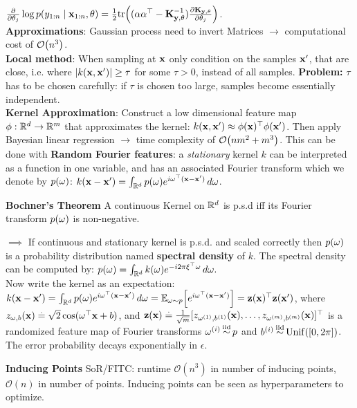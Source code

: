 $\pdv{}{\theta_j} \log p(y_{1:n} \mid \vx_{1:n}, \vtheta) = \frac{1}{2} \tr{(\valpha \transpose{\valpha} - \inv{\mK_{\vy,\vtheta}}) \pdv{\mK_{\vy,\vtheta}}{\theta_j}}$.\\
\textbf{Approximations}: Gaussian process need to invert Matrices $\rightarrow$ computational cost of $\BigO{n^3}$. \\ 
\textbf{Local method}: When sampling at $\mathbf{x}$ only condition on the samples $\mathbf{x'}$, that are close, i.e. where $\left| k(\mathbf{x}, \mathbf{x'}) \right| \geq \tau$ for some $\tau > 0$, instead of all samples. \textbf{Problem:} $\tau$ has to be chosen carefully: if $\tau$ is chosen too large, samples become essentially independent. \\
\textbf{Kernel Approximation}: Construct a low dimensional feature map $\mathbf{\phi} : \mathbb{R}^d \to \mathbb{R}^m$ that approximates the kernel: $k(\mathbf{x}, \mathbf{x'}) \approx \mathbf{\phi}(\mathbf{x})^\top \mathbf{\phi}(\mathbf{x'})$. Then apply Bayesian linear regression $\rightarrow$ time complexity of $\BigO{n m^2 + m^3}$. This can be done with \textbf{Random Fourier features}: a \textit{stationary} kernel $k$ can be interpreted as a function in one variable, and has an associated Fourier transform which we denote by $p(\mathbf{\omega})$: $k(\mathbf{x}-\mathbf{x'}) = \int_{\mathbb{R}^d} p(\mathbf{\omega}) e^{i \mathbf{\omega}^\top (\mathbf{x}-\mathbf{x'})} \,d\mathbf{\omega}$.
\begin{framed}
    \textbf{Bochner's Theorem} A continuous Kernel on $\mathbb{R}^d$ is p.s.d iff its Fourier transform $p(\mathbf{\omega})$ is non-negative.
\end{framed}
$\implies$ If continuous and stationary kernel is p.s.d. and scaled correctly then $p(\mathbf{\omega})$ is a probability distribution named \textbf{spectral density} of $k$. The spectral density can be computed by: $p(\mathbf{\omega}) = \int_{\mathbb{R}^d} k(\mathbf{\omega}) e^{- i 2 \pi \mathbf{\xi}^\top \mathbf{\omega}} \,d\mathbf{\omega}.$ \\ Now write the kernel as an expectation: $k(\vx-\vxp) = \int_{\R^d} p(\vomega) e^{i \transpose{\vomega} (\vx-\vxp)} \,d\vomega = \E[\vomega \sim p]{e^{i \transpose{\vomega}(\vx-\vxp)}}= \transpose{\vz(\vx)} \vz(\vxp)$, where $z_{\mathbf{\omega},b}(\mathbf{x}) \overset{.}{=} \sqrt{2} \cos(\mathbf{\omega}^\top \mathbf{x} + b)$, and $\mathbf{z}(\mathbf{x}) \overset{.}{=} \frac{1}{\sqrt{m}} [z_{\mathbf{\omega}^{(1)},b^{(1)}}(\mathbf{x}), \dots, z_{\mathbf{\omega}^{(m)},b^{(m)}}(\mathbf{x})]^\top$ is a randomized feature map of Fourier transforms $\mathbf{\omega}^{(i)} \operatorname*{\smash{\overset{\mathrm{iid}}{\sim}}} p$ and $b^{(i)} \iid \Unif{\brackets{0, 2 \pi}}$. The error probability decays exponentially in $\epsilon$.
\begin{framed}
    \textbf{Inducing Points}    
    SoR/FITC: runtime \(\mathcal{O}(n^3)\) in number of inducing points, \(\mathcal{O}(n)\) in number of points. Inducing points can be seen as hyperparameters to optimize.
\end{framed}
